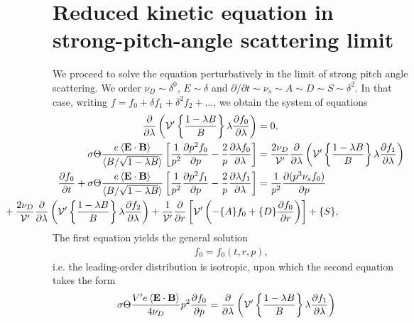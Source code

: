 \documentclass[11pt,a4paper]{article}
\renewcommand{\b}[1]{\ensuremath{ {\bf #1 } }}
\begin{document}
\section{Reduced kinetic equation in strong-pitch-angle scattering limit}
We proceed to solve the equation perturbatively in the limit of strong pitch angle scattering. We order $\nu_D \sim \delta^0$, $E \sim \delta$ and $\partial/\partial t \sim \nu_s \sim A \sim D \sim S \sim \delta^2$. In that case, writing $f=f_0+\delta f_1+\delta^2 f_2 + ...$, we obtain the system of equations
\begin{align}
\frac{\partial}{\partial \lambda}\left(  \mathcal{V'}\left\{\frac{1-\lambda B}{B}\right\} \lambda\frac{\partial f_0}{\partial \lambda}\right) &= 0, \\
\sigma \Theta \frac{e \left\langle \b{E}\cdot\b{B}\right\rangle}{\langle B/\sqrt{1-\lambda B} \rangle}\left[\frac{1}{p^2}\frac{\partial p^2 f_0}{\partial p}  - \frac{2}{p}\frac{\partial \lambda f_0}{\partial \lambda}\right] &=  \frac{2\nu_D}{\mathcal{V}'}\frac{\partial}{\partial \lambda}\left(  \mathcal{V'}\left\{\frac{1-\lambda B}{B}\right\} \lambda\frac{\partial f_1}{\partial \lambda}\right) \\
%
\frac{\partial f_0}{\partial t} + \sigma \Theta \frac{e \left\langle \b{E}\cdot\b{B}\right\rangle}{\langle B/\sqrt{1-\lambda B} \rangle}\left[\frac{1}{p^2}\frac{\partial p^2 f_1}{\partial p}  - \frac{2}{p}\frac{\partial \lambda f_1}{\partial \lambda}\right]  &= \frac{1}{p^2}\frac{\partial(p^3 \nu_s f_0)}{\partial p} \nonumber \\
&\hspace{-90mm}+ \frac{2\nu_D}{\mathcal{V}'}\frac{\partial}{\partial \lambda}\left(  \mathcal{V'}\left\{\frac{1-\lambda B}{B}\right\} \lambda\frac{\partial f_2}{\partial \lambda}\right)+\frac{1}{\mathcal{V}'}\frac{\partial}{\partial r}\left[ \mathcal{V'}\left(-\{A\}f_0+ \{D\}\frac{\partial f_0}{\partial r} \right) \right] + \{S\},
\end{align}
The first equation yields the general solution
\begin{align}
f_0 = f_0(t,r,p),
\end{align}
i.e. the leading-order distribution is isotropic, upon which the second equation takes the form
\begin{align}
\sigma \Theta \frac{V'e \left\langle \b{E}\cdot\b{B}\right\rangle}{4\nu_D}p^2\frac{\partial  f_0}{\partial p} &=  \frac{\partial}{\partial \lambda}\left(  \mathcal{V'}\left\{\frac{1-\lambda B}{B}\right\} \lambda\frac{\partial f_1}{\partial \lambda}\right) 
\end{align}
\end{document}
